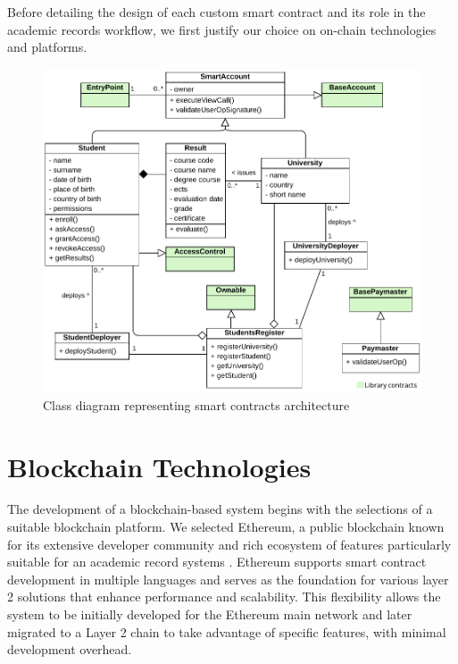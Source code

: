 Before detailing the design of each custom smart contract and its role in the academic records workflow, we first justify our choice on on-chain technologies and platforms. 

\begin{figure}
  \centering
  \includegraphics[width=1\textwidth]{figures/Contracts class diagram.pdf}
  \caption[Smart contracts architecture class diagram]{Class diagram representing smart contracts architecture}
  \label{fig:contractsClass}
\end{figure}

\section{Blockchain Technologies}
The development of a blockchain-based system begins with the selections of a suitable blockchain platform. We selected Ethereum, a public blockchain known for its extensive developer community and rich ecosystem of features particularly suitable for an academic record systems \cite{mustafa2024publiceduchain}\cite{yassynzhanbolatzhan2021verificationuniversitystudent}. Ethereum supports smart contract development in multiple languages and serves as the foundation for various layer 2 solutions that enhance performance and scalability. This flexibility allows the system to be initially developed for the Ethereum main network and later migrated to a Layer 2 chain to take advantage of specific features, with minimal development overhead. 

